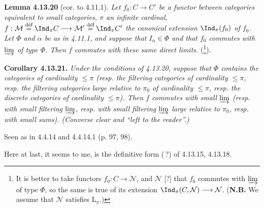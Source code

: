 \textbf{Lemma 4.13.20} (cor. to 4.11.1). \textit{Let $f_0 : C\longrightarrow C'$ be a functor between categories equivalent to small categories, $\pi$ an infinite cardinal, $f:\mathcal{M}\stackrel{\textup{déf}}{=}\Ind_\pi C\longrightarrow\mathcal{M}'\stackrel{\textup{déf}}{=}\Ind_\pi C'$ the canonical extension $\Ind_\pi(f_0)$ of $f_0$. Let $\Phi$ and $\alpha$ be as in 4.11.1, and suppose that $I_\alpha\in\Phi$ and that $f_0$ commutes with $\varinjlim$ of type $\Phi$. Then $f$ commutes with these same direct limits.} (\footnote{It is better to take functors $f_0 : C\longrightarrow\mathcal{N}$, and $\mathcal{N}$ [?] that $f_0$ commutes with $\varinjlim$ of type $\Phi$, so the same is true of its extension $\Ind_\pi(C,\mathcal{N})\longrightarrow\mathcal{N}$. (\textbf{N.B.} We assume that $\mathcal{N}$ satisfies $\mathrm{L}_\pi$.)}).

\textbf{Corollary 4.13.21.} \textit{Under the conditions of 4.13.20, suppose that $\Phi$ contains the categories of cardinality $\leqslant\pi$ (resp. the filtering categories of cardinality $\leqslant\pi$, resp. the filtering categories large relative to $\pi_0$ of cardinality $\leqslant\pi$, resp. the discrete categories of cardinality $\leqslant\pi$). Then $f$ commutes with small $\varinjlim$ (resp. with small filtering $\varinjlim$, resp. with small filtering $\varinjlim$ large relative to $\pi_0$, resp. with small sums). (Converse clear and ``left to the reader''.)}

Seen as in 4.4.14 and 4.4.14.1 (p. 97, 98).

Here at last, it seems to me, is the definitive form (\,?) of 4.13.15, 4.13.18.

